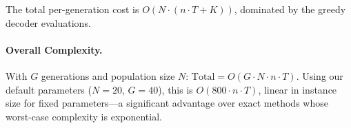 The total per-generation cost is $O(N \cdot (n \cdot T + K))$, dominated by the greedy decoder evaluations.

\paragraph{Overall Complexity.}
With $G$ generations and population size $N$:
$\text{Total} = O(G \cdot N \cdot n \cdot T)$.
Using our default parameters ($N=20$, $G=40$), this is $O(800 \cdot n \cdot T)$, linear in instance size for fixed parameters---a significant advantage over exact methods whose worst-case complexity is exponential.
